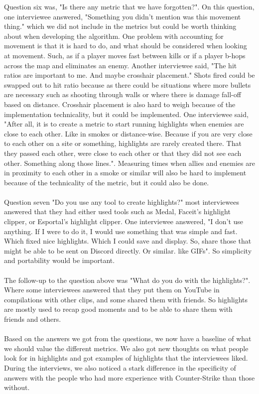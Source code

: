 Question six was, "Is there any metric that we have forgotten?". On this question, one interviewee answered, "Something you didn't mention was this movement thing." which we did not include in the metrics but could be worth thinking about when developing the algorithm. One problem with accounting for movement is that it is hard to do, and what should be considered when looking at movement. Such, as if a player moves fast between kills or if a player b-hops across the map and eliminates an enemy. Another interviewee said, "The hit ratios are important to me. And maybe crosshair placement." Shots fired could be swapped out to hit ratio because as there could be situations where more bullets are necessary such as shooting through walls or where there is damage fall-off based on distance. Crosshair placement is also hard to weigh because of the implementation technicality, but it could be implemented. One interviewee said, "After all, it is to create a metric to start running highlights when enemies are close to each other. Like in smokes or distance-wise. Because if you are very close to each other on a site or something, highlights are rarely created there. That they passed each other, were close to each other or that they did not see each other. Something along those lines.". Measuring times when allies and enemies are in proximity to each other in a smoke or similar will also be hard to implement because of the technicality of the metric, but it could also be done. \\\\
Question seven "Do you use any tool to create highlights?" most interviewees answered that they had either used tools such as Medal, Faceit's highlight clipper, or Esportal's highlight clipper. One interviewee answered, "I don't use anything. If I were to do it, I would use something that was simple and fast. Which fixed nice highlights. Which I could save and display. So, share those that might be able to be sent on Discord directly. Or similar. like GIFs". So simplicity and portability would be important.\\\\
The follow-up to the question above was "What do you do with the highlights?". Where some interviewees answered that they put them on YouTube in compilations with other clips, and some shared them with friends. So highlights are mostly used to recap good moments and to be able to share them with friends and others.\\\\
Based on the answers we got from the questions, we now have a baseline of what we should value the different metrics. We also got new thoughts on what people look for in highlights and got examples of highlights that the interviewees liked. During the interviews, we also noticed a stark difference in the specificity of answers with the people who had more experience with Counter-Strike than those without. 
